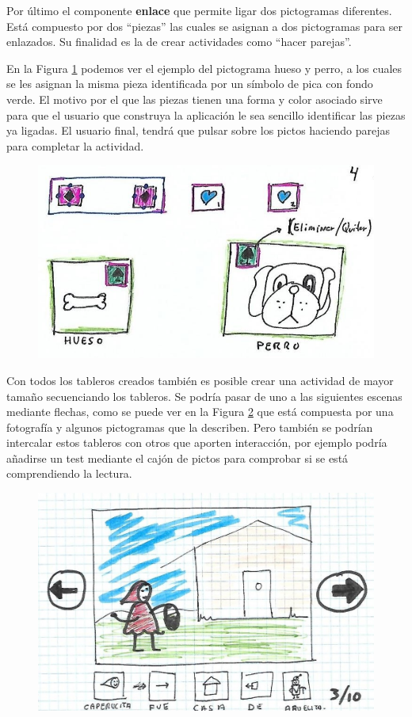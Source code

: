 Por último el componente \textbf{enlace} que permite ligar dos pictogramas diferentes. Está compuesto por dos “piezas” las cuales se asignan a dos pictogramas para ser enlazados. Su finalidad es la de crear actividades como “hacer parejas”.

En la Figura \ref{fig:componenteenla} podemos ver el ejemplo del pictograma hueso y perro, a los cuales se les asignan la misma pieza identificada por un símbolo de pica con fondo verde. El motivo por el que  las piezas tienen una forma y color asociado sirve para que el usuario que construya la aplicación le sea sencillo identificar las piezas ya  ligadas. El usuario final, tendrá que pulsar sobre los pictos haciendo parejas para completar la actividad.

\begin{figure}[h!]
	\centering
	\includegraphics[width=0.7\linewidth]{Imagenes/Bitmap/componenteEnla}
	\caption{}
	\label{fig:componenteenla}
\end{figure}



Con todos los tableros creados también es posible crear una actividad de mayor tamaño secuenciando los tableros. Se podría pasar de uno a las siguientes escenas mediante flechas, como se puede ver en la Figura \ref{fig:cuento} que está compuesta por una fotografía y algunos pictogramas que la describen. Pero también se podrían intercalar estos tableros con otros que aporten interacción, por ejemplo podría añadirse un test mediante el cajón de pictos para comprobar si se está comprendiendo la lectura.

\begin{figure}[h!]
	\centering
	\includegraphics[width=0.7\linewidth]{Imagenes/Bitmap/Cuento}
	\caption{}
	\label{fig:cuento}
\end{figure}


